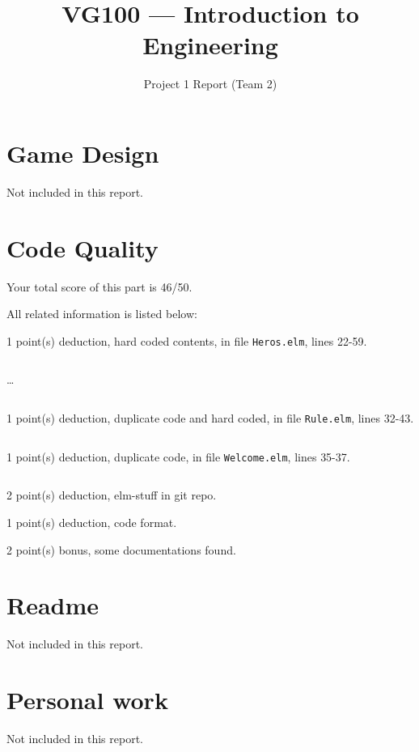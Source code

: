 \documentclass{article}
\title{VG100 --- Introduction to\\ Engineering}
\subtitle{Project 1 Report (Team 2)}
\begin{document}
\maketitle

\section{Game Design}

Not included in this report.

\section{Code Quality}

Your total score of this part is 46/50. \medskip

All related information is listed below: \medskip

1 point(s) {\color{red}deduction}, hard coded contents, in file {\color{blue}\texttt{Heros.elm}}, lines {\color{blue}22-59}.

\inputminted[firstline=22,lastline=31]{elm}{Heros.elm}

\dots

\inputminted[firstline=50,lastline=59]{elm}{Heros.elm}

1 point(s) {\color{red}deduction}, duplicate code and hard coded, in file {\color{blue}\texttt{Rule.elm}}, lines {\color{blue}32-43}.

\inputminted[firstline=32,lastline=43]{elm}{Rule.elm}

1 point(s) {\color{red}deduction}, duplicate code, in file {\color{blue}\texttt{Welcome.elm}}, lines {\color{blue}35-37}.

\inputminted[firstline=35,lastline=37]{elm}{Welcome.elm}

2 point(s) {\color{red}deduction}, elm-stuff in git repo.\medskip

1 point(s) {\color{red}deduction}, code format.\medskip

2 point(s) {\color{red}bonus}, some documentations found.\medskip



\newpage

\section{Readme}

Not included in this report.

\section{Personal work}

Not included in this report.


\newpage
\end{document}

